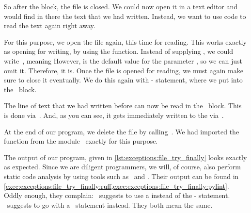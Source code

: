 So after the block, the file is closed.
We could now open it in a text editor and would find in there the text that we had written.
Instead, we want to use code to read the text again right away.

For this purpose, we open the file again, this time for reading.
This works exactly as opening for writing, by using the  function.
Instead of supplying , we could write~, meaning 
However,  is the default value for the parameter , so we can just omit it.
Therefore,  it is.
Once the file is opened for reading, we must again make sure to close it eventually.
We do this again with - statement, where we put  into the ~block.

The line of text that we had written before can now be read in the ~block.
This is done via~.
And, as you can see, it gets immediately written to the  via~.

At the end of our program, we delete the file  by calling~.
We had imported the  function from the module~ exactly for this purpose.

The output of our program, given in \cref{lst:exceptions:file_try_finally} looks exactly as expected.
Since we are diligent programmers, we will, of course, also perform static code analysis by using tools such as \ruff\ and \pylint.
Their output can be found in \cref{exec:exceptions:file_try_finally:ruff,exec:exceptions:file_try_finally:pylint}.
Oddly enough, they complain:
\ruff\ suggests to use a  instead of the - statement.
\pylint\ suggests to go with a ~statement instead.
They both mean the same.

